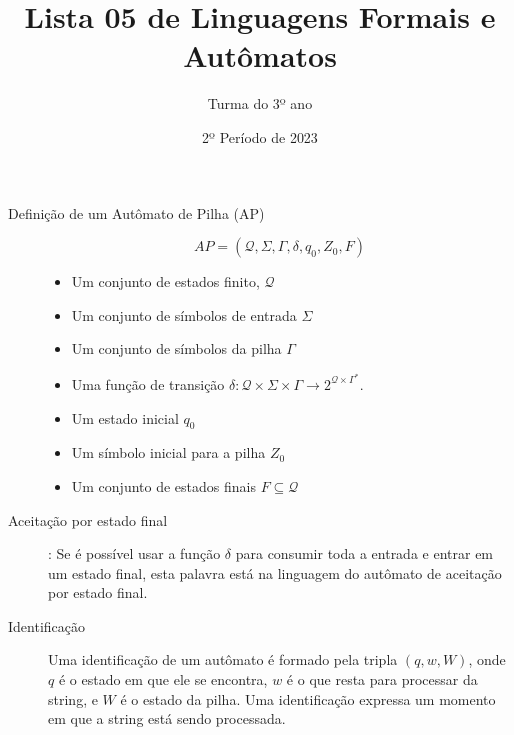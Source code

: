 \documentclass[12pt]{article}
\title{Lista 05 de Linguagens Formais e Autômatos}
\date{2º Período de 2023}
\author{Turma do 3º ano}
\def\cQ{\mathcal{Q}}
\begin{document}
 

\maketitle

\begin{description}


\item[Definição de um Autômato de Pilha (AP)]
\[AP = (\cQ, \Sigma, \Gamma, \delta, q_0, Z_0, F)\]
\begin{itemize}
\item Um conjunto de estados finito, $\cQ$
\item Um conjunto de símbolos de entrada $\Sigma$
\item Um conjunto de símbolos da pilha $\Gamma$
\item Uma função de transição $\delta: \cQ\times\Sigma\times\Gamma\rightarrow 2^{\cQ\times \Gamma^*}$.
\item Um estado inicial $q_0$
\item Um símbolo inicial para a pilha $Z_0$
\item Um conjunto de estados finais $F\subseteq \cQ$
\end{itemize}


\item[Aceitação por estado final]: Se é possível usar a função $\delta$ para consumir toda a entrada e entrar em um estado final, esta palavra está na linguagem do autômato de aceitação por estado final.


\item[Identificação] Uma identificação de um autômato é formado pela tripla $(q,w,W)$, onde $q$ é o estado em que ele se encontra, $w$ é o que resta para processar da string, e $W$ é o estado da pilha.
Uma identificação expressa um momento em que a string está sendo processada.



\end{description}

\vspace{3em}
\end{document}

